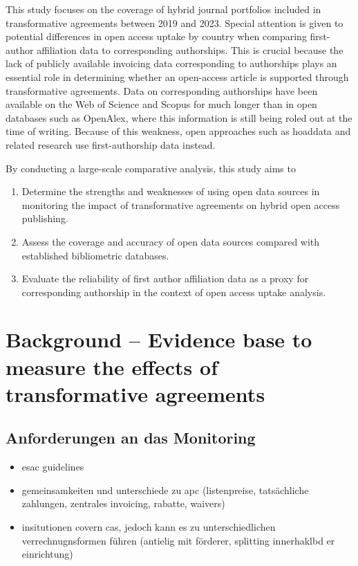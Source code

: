 \documentclass[a4paper,man,floatsintext,longtable,noextraspace,10pt]{apa6}
\providecommand{\tightlist}{%
  \setlength{\itemsep}{0pt}\setlength{\parskip}{0pt}}
\begin{document}
This study focuses on the coverage of hybrid journal portfolios included
in transformative agreements between 2019 and 2023. Special attention is
given to potential differences in open access uptake by country when
comparing first-author affiliation data to corresponding authorships.
This is crucial because the lack of publicly available invoicing data
corresponding to authorships plays an essential role in determining
whether an open-access article is supported through transformative
agreements. Data on corresponding authorships have been available on the
Web of Science and Scopus for much longer than in open databases such as
OpenAlex, where this information is still being roled out at the time of
writing. Because of this weakness, open approaches such as hoaddata and
related research use first-authorship data instead.

By conducting a large-scale comparative analysis, this study aims to

\begin{enumerate}
\def\labelenumi{\arabic{enumi}.}
\tightlist
\item
  Determine the strengths and weaknesses of using open data sources in
  monitoring the impact of transformative agreements on hybrid open
  access publishing.
\item
  Assess the coverage and accuracy of open data sources compared with
  established bibliometric databases.
\item
  Evaluate the reliability of first author affiliation data as a proxy
  for corresponding authorship in the context of open access uptake
  analysis.
\end{enumerate}

\section{Background -- Evidence base to measure the effects of
transformative
agreements}\label{background-evidence-base-to-measure-the-effects-of-transformative-agreements}

\subsection{Anforderungen an das
Monitoring}\label{anforderungen-an-das-monitoring}

\begin{itemize}
\tightlist
\item
  esac guidelines
\item
  gemeinsamkeiten und unterschiede zu apc (listenpreise, tatsächliche
  zahlungen, zentrales invoicing, rabatte, waivers)
\item
  insitutionen covern cas, jedoch kann es zu unterschiedlichen
  verrechnugnsformen führen (antielig mit förderer, splitting
  innerhaklbd er einrichtung)
\end{itemize}
\end{document}
